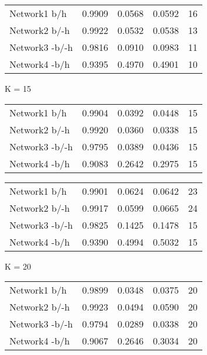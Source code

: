 \begin{table*}[h]
\begin{minipage}[h]{0.45\linewidth}
\begin{tabular}{lrrrr}
 Network1 b/h        &   0.9909 &      0.0568 &   0.0592 & 16 \\
 Network2 b/-h     &   0.9922 &      0.0532 &   0.0538 & 13 \\
 Network3 -b/-h    &   0.9816 &      0.0910 &   0.0983 & 11 \\
 Network4 -b/h      &   0.9395 &      0.4970 &   0.4901 & 10 \\
\hline
\end{tabular}
\end{minipage}


	\begin{minipage}[h]{0.45\linewidth} 
K = 15
\begin{tabular}{lrrrr}

 Network1 b/h          &   0.9904 &      0.0392 &   0.0448 & 15 \\
 Network2 b/-h       &   0.9920 &      0.0360 &   0.0338 & 15 \\
 Network3 -b/-h      &   0.9795 &      0.0389 &   0.0436 & 15 \\
 Network4 -b/h        &   0.9083 &      0.2642 &   0.2975 & 15 \\
\hline
\end{tabular}
\end{minipage}
\hspace{0.5cm}
\begin{minipage}[h]{0.45\linewidth}
\begin{tabular}{lrrrr}

 Network1 b/h        &   0.9901 &      0.0624 &   0.0642 & 23 \\
 Network2 b/-h     &   0.9917 &      0.0599 &   0.0665 & 24 \\
 Network3 -b/-h    &   0.9825 &      0.1425 &   0.1478 & 15 \\
 Network4 -b/h      &   0.9390 &      0.4994 &   0.5032 & 15 \\
\hline
\end{tabular}
\end{minipage}


	\begin{minipage}[h]{0.45\linewidth} 
K = 20
\begin{tabular}{lrrrr}

 Network1 b/h          &   0.9899 &      0.0348 &   0.0375 & 20 \\
 Network2 b/-h       &   0.9923 &      0.0494 &   0.0590 & 20 \\
 Network3 -b/-h      &   0.9794 &      0.0289 &   0.0338 & 20 \\
 Network4 -b/h        &   0.9067 &      0.2646 &   0.3034 & 20 \\
\hline
\end{tabular}
\end{minipage}
\hspace{0.5cm}
\begin{minipage}[h]{0.45\linewidth}
\begin{tabular}{lrrrr}


\end{tabular}
\end{minipage}
\end{table*}
